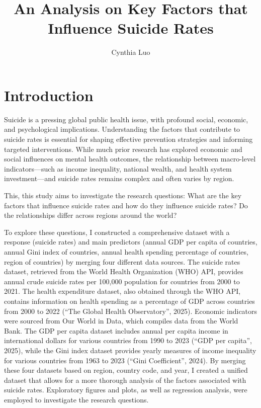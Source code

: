 \documentclass[
]{article}
\title{An Analysis on Key Factors that Influence Suicide Rates}
\author{Cynthia Luo}
\date{}
\begin{document}
\maketitle

\hfill\break

\section{Introduction}\label{introduction}

Suicide is a pressing global public health issue, with profound social,
economic, and psychological implications. Understanding the factors that
contribute to suicide rates is essential for shaping effective
prevention strategies and informing targeted interventions. While much
prior research has explored economic and social influences on mental
health outcomes, the relationship between macro-level indicators---such
as income inequality, national wealth, and health system
investment---and suicide rates remains complex and often varies by
region.

This, this study aims to investigate the research questions: What are
the key factors that influence suicide rates and how do they influence
suicide rates? Do the relationships differ across regions around the
world?

To explore these questions, I constructed a comprehensive dataset with a
response (suicide rates) and main predictors (annual GDP per capita of
countries, annual Gini index of countries, annual health spending
percentage of countries, region of countries) by merging four different
data sources. The suicide rates dataset, retrieved from the World Health
Organization (WHO) API, provides annual crude suicide rates per 100,000
population for countries from 2000 to 2021. The health expenditure
dataset, also obtained through the WHO API, contains information on
health spending as a percentage of GDP across countries from 2000 to
2022 (``The Global Health Observatory'', 2025). Economic indicators were
sourced from Our World in Data, which compiles data from the World Bank.
The GDP per capita dataset includes annual per capita income in
international dollars for various countries from 1990 to 2023 (``GDP per
capita'', 2025), while the Gini index dataset provides yearly measures
of income inequality for various countries from 1963 to 2023 (``Gini
Coefficient'', 2024). By merging these four datasets based on region,
country code, and year, I created a unified dataset that allows for a
more thorough analysis of the factors associated with suicide rates.
Exploratory figures and plots, as well as regression analysis, were
employed to investigate the research questions.
\end{document}
